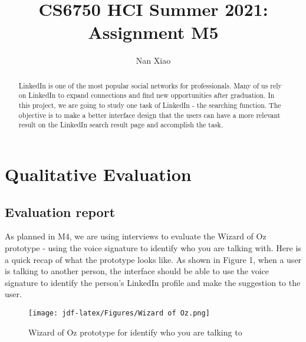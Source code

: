 \documentclass[
	letterpaper, %
]{jdf}
\author{Nan Xiao}
\title{CS6750 HCI Summer 2021:\\Assignment M5}
\begin{document}

\maketitle

\begin{abstract}
	LinkedIn is one of the most popular social networks for professionals. Many of us rely on LinkedIn to expand connections and find new opportunities after graduation. In this project, we are going to study one task of LinkedIn - the searching function. The objective is to make a better interface design that the users can have a more relevant result on the LinkedIn search result page and accomplish the task.
\end{abstract}

\section{Qualitative Evaluation}
\subsection{Evaluation report}
As planned in M4, we are using interviews to evaluate the Wizard of Oz prototype - using the voice signature to identify who you are talking with. Here is a quick recap of what the prototype looks like. As shown in Figure 1, when a user is talking to another person, the interface should be able to use the voice signature to identify the person's LinkedIn profile and make the suggestion to the user.
\begin{figure}[h]
	\centering
	\texttt{[image: jdf-latex/Figures/Wizard of Oz.png]}
	\caption{Wizard of Oz prototype for identify who you are talking to}
	\label{fig:wizard}
\end{figure}
\end{document}
